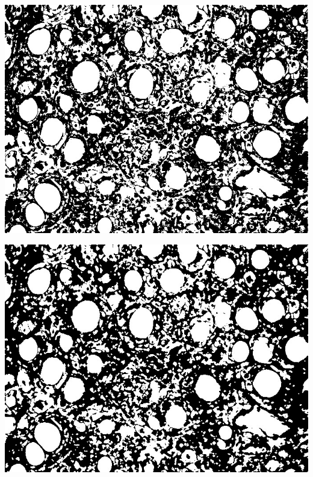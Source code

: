 \documentclass[a4paper]{article}
\begin{document}
\noindent
\begin{minipage}{0.24\textwidth}
    \centering
    \includegraphics[width=\textwidth]{../code/task1/output/kernel_size_1.jpg}
\end{minipage}
\hfill
\begin{minipage}{0.24\textwidth}
    \centering
    \includegraphics[width=\textwidth]{../code/task1/output/kernel_size_3.jpg}
\end{minipage}
\hfill
\end{document}
